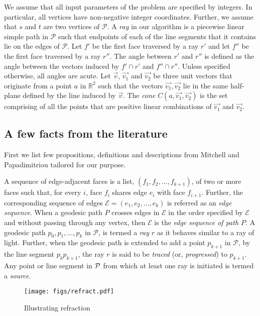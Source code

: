 \documentclass[11pt]{article}
\def\calP{\mathcal{P}}
\def\calE{\mathcal{E}}
\begin{document}
We assume that all input parameters of the problem are specified by integers.
In particular, all vertices have non-negative integer coordinates.
Further, we assume that $s$ and $t$ are two vertices of $\calP$.
A {\it ray} in our algorithm is a piecewise linear simple path in $\mathcal{P}$ such that endpoints of each of the line segments that it contains lie on the edges of $\calP$.
Let $f'$ be the first face traversed by a ray $r'$ and let $f''$ be the first face traversed by a ray $r''$.
The angle between $r'$ and $r''$ is defined as the angle between the vectors induced by $f' \cap r'$ and $f'' \cap r''$.
Unless specified otherwise, all angles are acute.
Let $\overrightarrow{v}$, $\overrightarrow{v_1}$ and $\overrightarrow{v_2}$ be three unit vectors that originate from a point $a$ in $\mathbb{R}^2$ such that the vectors $\overrightarrow{v_1}, \overrightarrow{v_2}$ lie in the same half-plane defined by the line induced by $\overrightarrow{v}$.
The {\it cone} $C(a, \overrightarrow{v_1}, \overrightarrow{v_2})$ is the set comprising of all the points that are positive linear combinations of $\overrightarrow{v_1}$ and $\overrightarrow{v_2}$.

\subsection*{A few facts from the literature} 

First we list few propositions, definitions and descriptions from Mitchell and Papadimitriou \cite{journals/jacm/MitchellP91} tailored for our purpose.

A sequence of edge-adjacent faces is a list, $(f_1, f_2, \ldots, f_{k+1})$, of two or more faces such that, for every $i$, face $f_i$ shares edge $e_i$ with face $f_{i+1}$.
Further, the corresponding sequence of edges $\calE = (e_1, e_2, \ldots, e_k)$ is referred as an {\it edge sequence}.
When a geodesic path $P$ crosses edges in $\calE$ in the order specified by $\calE$ and without passing through any vertex, then $\calE$ is the {\it edge sequence of path $P$}.
A geodesic path $p_0, p_1, \ldots, p_k$ in $\mathcal{P}$, is termed a {\it ray} $r$ as it behaves similar to a  ray of light.
Further, when the geodesic path is extended to add a  point $p_{k+1}$ in $\mathcal{P}$, by the  line segment $p_kp_{k+1}$, the ray $r$ is said to be {\it traced} (or, {\it progressed}) to $p_{k+1}$.
Any point or line segment in $\cal{P}$ from which at least one ray is initiated is termed a {\it source}.

	\begin{wrapfigure}{r}{0.5\textwidth}
	\centering
	\begin{minipage}[t]{\linewidth}
	\centering
	\texttt{[image: figs/refract.pdf]}
	\vspace{-0.15in}
	\caption{\footnotesize Illustrating refraction}
	\label{fig:refraction}
	\end{minipage}
	\end{wrapfigure}
\end{document}
